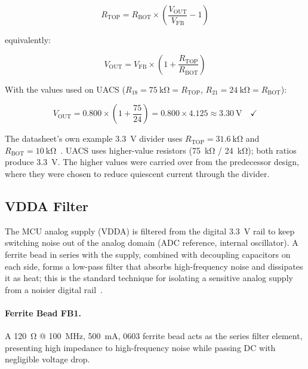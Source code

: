 \begin{equation}
  R_\mathrm{TOP} = R_\mathrm{BOT} \times \left(\frac{V_\mathrm{OUT}}{V_\mathrm{FB}} - 1\right)
  \label{eq:feedback-rtop}
\end{equation}

equivalently:

\begin{equation}
  V_\mathrm{OUT} = V_\mathrm{FB} \times \left(1 + \frac{R_\mathrm{TOP}}{R_\mathrm{BOT}}\right)
  \label{eq:feedback-vout}
\end{equation}

With the values used on UACS ($R_{18} = \SI{75}{\kilo\ohm} = R_\mathrm{TOP}$,
$R_{21} = \SI{24}{\kilo\ohm} = R_\mathrm{BOT}$):

\begin{equation}
  V_\mathrm{OUT} = 0.800 \times \left(1 + \frac{75}{24}\right) = 0.800 \times 4.125 \approx \SI{3.30}{\volt} \quad \checkmark
  \label{eq:vout-calc}
\end{equation}

The datasheet's own example \SI{3.3}{\volt} divider uses $R_\mathrm{TOP} = \SI{31.6}{\kilo\ohm}$
and $R_\mathrm{BOT} = \SI{10}{\kilo\ohm}$~\cite{ref2}. UACS uses higher-value resistors
(\SI{75}{\kilo\ohm} / \SI{24}{\kilo\ohm}); both ratios produce \SI{3.3}{\volt}. The higher
values were carried over from the predecessor design, where they were chosen to reduce
quiescent current through the divider.

\subsection{VDDA Filter}
\label{subsec:vdda}

The MCU analog supply (VDDA) is filtered from the digital \SI{3.3}{\volt} rail to keep
switching noise out of the analog domain (ADC reference, internal oscillator). A ferrite
bead in series with the supply, combined with decoupling capacitors on each side, forms a
low-pass filter that absorbs high-frequency noise and dissipates it as heat; this is the
standard technique for isolating a sensitive analog supply from a noisier digital
rail~\cite{ref21}.

\paragraph{Ferrite Bead FB1.}
A \SI{120}{\ohm} @ \SI{100}{\mega\hertz}, \SI{500}{\milli\ampere}, 0603 ferrite bead acts
as the series filter element, presenting high impedance to high-frequency noise while
passing DC with negligible voltage drop.

